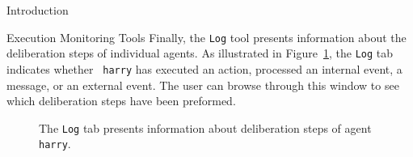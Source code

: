 \begin{chapter}{Introduction}
\begin{section}{Execution Monitoring Tools}
Finally, the {\tt Log} tool presents information about the
deliberation steps of individual agents. As illustrated in
Figure~\ref{fig:log}, the {\tt Log} tab indicates whether {\tt
harry} has executed an action, processed an internal event, a
message, or an external event. The user can browse through this
window to see which deliberation steps have been preformed.

\begin{figure}
    \begin{center}
        \caption{The {\tt Log} tab presents information about deliberation steps of agent {\tt harry}.}\label{fig:log}
    \end{center}
\end{figure}

\end{section}
\end{chapter}
